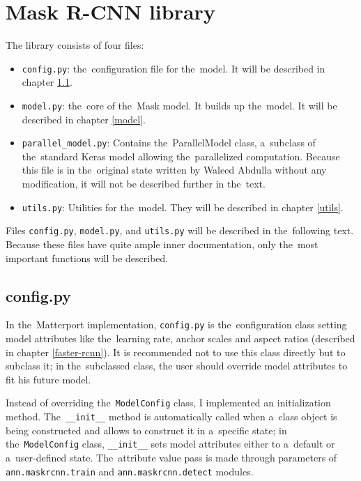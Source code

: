 \section{Mask R-CNN library}
\label{library}

The library consists of four files:
\begin{itemize}
	 \item \verb|config.py|: the~configuration file for the~model. It will be described in chapter \ref{config}.
	 \item \verb|model.py|: the~core of the~Mask  model. It builds up the~model. It will be described in chapter \ref{model}.
	 \item \verb|parallel_model.py|: Contains the~ParallelModel class, a~subclass of the~standard Keras model allowing the~parallelized computation. Because this file is in the~original state written by Waleed Abdulla without any modification, it will not be described further in the~text.
	 \item \verb|utils.py|: Utilities for the~model. They will be described in chapter \ref{utils}.
\end{itemize}

Files \verb|config.py|, \verb|model.py|, and \verb|utils.py| will be described 
in the~following text. Because these files have quite ample inner documentation, 
only the~most important functions will be described.

\subsection{config.py}
\label{config}

In the~Matterport implementation, \verb|config.py| is the~configuration class 
setting model attributes like the~learning rate,  anchor scales and 
aspect ratios (described in chapter \ref{faster-rcnn}). It is recommended not to 
use this class directly but to subclass it; in the~subclassed class, the user should 
override model attributes to fit his future model.

Instead of overriding the~\verb|ModelConfig| class, I implemented an 
initialization method. The~\verb|__init__| method is automatically called when
a~class object is being constructed and allows to construct it in a~specific 
state; in the~\verb|ModelConfig| class, \verb|__init__| sets model attributes 
either to a~default or a~user-defined state. The~attribute value pass is made 
through parameters of \verb|ann.maskrcnn.train| and \verb|ann.maskrcnn.detect| 
modules.

